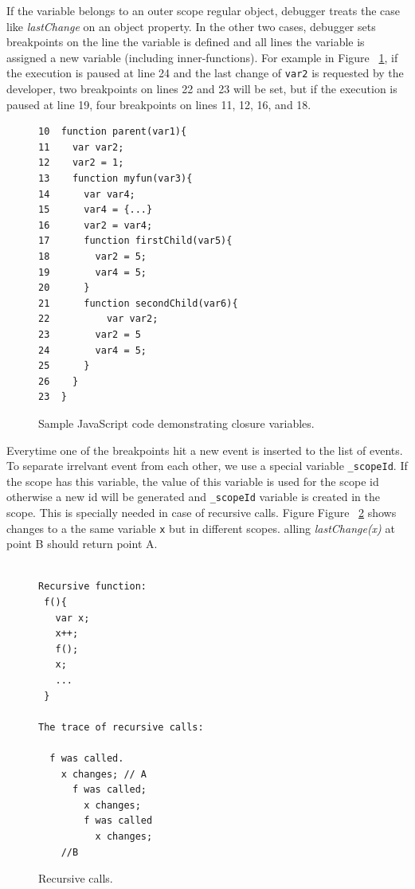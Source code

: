 \documentclass[preprint]{sigplanconf}
\begin{document}
If the variable belongs to an outer scope regular object, debugger treats the case like \textit{lastChange} on an object property. In the other two cases, debugger sets breakpoints on the line the variable is defined and all lines the variable is assigned a new variable (including inner-functions). For example in Figure ~\ref{fig:js-closure}, if the execution is paused at line 24 and the last change of \texttt{var2} is requested by the developer, two breakpoints on lines 22 and 23 will be set, but if the execution is paused at line 19, four breakpoints on lines 11, 12, 16, and 18.


\begin{figure}[htp]
\begin{verbatim}
10  function parent(var1){
11    var var2;
12    var2 = 1;
13    function myfun(var3){
14      var var4;
15      var4 = {...}
16      var2 = var4;
17      function firstChild(var5){
18        var2 = 5;
19        var4 = 5;
20      }  
21      function secondChild(var6){
22       	var var2;
23        var2 = 5			      
24        var4 = 5;	
25      }
26    }  
23  }    
\end{verbatim}
\caption{Sample JavaScript code demonstrating closure variables.}
\label{fig:js-closure}
\end{figure}


Everytime one of the breakpoints hit a new event is inserted to the list of events. To separate irrelvant event from each other, we use a special variable \texttt{\_scopeId}. If the scope has this variable, the value of this variable is used for the scope id otherwise a new id will be generated and \texttt{\_scopeId} variable is created in the scope. This is specially needed in case of recursive calls. Figure Figure ~\ref{fig:recursive} shows changes to a the same variable \texttt{x} but in different scopes. alling \textit{lastChange(x)} at point B should return point A.

\begin{figure}[htp]
\begin{verbatim}

Recursive function: 
 f(){
   var x;
   x++;
   f();
   x; 
   ...
 }

The trace of recursive calls:

  f was called.
    x changes; // A
      f was called;
        x changes;
        f was called
          x changes;
    //B 

\end{verbatim}
\caption{Recursive calls.}
\label{fig:recursive}
\end{figure}
\end{document}
